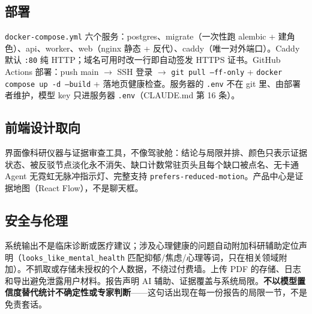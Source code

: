 \subsection{部署}

\texttt{docker-compose.yml} 六个服务：postgres、migrate（一次性跑 alembic + 建角色）、api、worker、web（nginx 静态 + 反代）、caddy（唯一对外端口）。Caddy 默认 \texttt{:80} 纯 HTTP；域名可用时改一行即自动签发 HTTPS 证书。GitHub Actions 部署：push main $\rightarrow$ SSH 登录 $\rightarrow$ \texttt{git pull --ff-only} + \texttt{docker compose up -d --build} + 落地页健康检查。服务器的 \texttt{.env} 不在 git 里、由部署者维护，模型 key 只进服务器 \texttt{.env}（CLAUDE.md 第 16 条）。

\subsection{前端设计取向}

界面像科研仪器与证据审查工具，不像驾驶舱：结论与局限并排、颜色只表示证据状态、被反驳节点淡化永不消失、缺口计数常驻页头且每个缺口被点名、无卡通 Agent 无霓虹无脉冲指示灯、完整支持 \texttt{prefers-reduced-motion}。产品中心是证据地图（React Flow），不是聊天框。

\subsection{安全与伦理}

系统输出不是临床诊断或医疗建议；涉及心理健康的问题自动附加科研辅助定位声明（\texttt{looks\_like\_mental\_health} 匹配抑郁/焦虑/心理等词，只在相关领域附加）。不抓取或存储未授权的个人数据，不绕过付费墙。上传 PDF 的存储、日志和导出避免泄露用户材料。报告声明 AI 辅助、证据覆盖与系统局限。\textbf{不以模型置信度替代统计不确定性或专家判断}——这句话出现在每一份报告的局限一节，不是免责套话。
